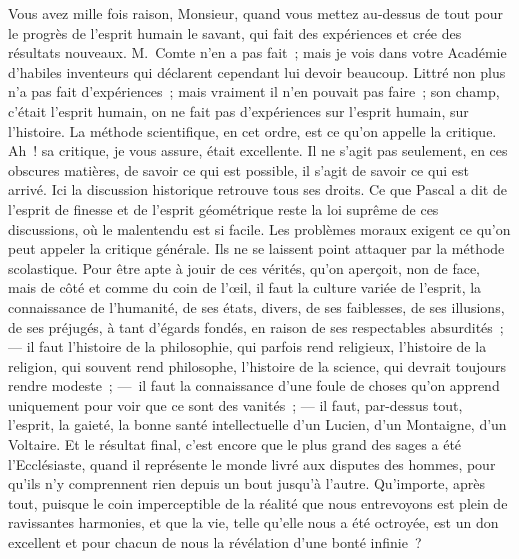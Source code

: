\documentclass[french,twoside]{book} %
\newcommand\orgName[1]{#1}
\newcommand\persName[1]{#1}
\begin{document}
Vous avez mille fois raison, Monsieur, quand vous mettez au-dessus de tout pour le progrès de l’esprit humain le savant, qui fait des expériences et crée des résultats nouveaux. {\persName M. Comte} n’en a pas fait ; mais je vois dans votre {\orgName Académie} d’habiles inventeurs qui déclarent cependant lui devoir beaucoup. {\persName Littré} non plus n’a pas fait d’expériences ; mais vraiment il n’en pouvait pas faire ; son champ, c’était l’esprit humain, on ne fait pas d’expériences sur l’esprit humain, sur l’histoire. La méthode scientifique, en cet ordre, est ce qu’on appelle la critique. Ah ! sa critique, je vous assure, était excellente. Il ne s’agit pas seulement, en ces obscures matières, de savoir ce qui est possible, il s’agit de savoir ce qui est arrivé. Ici la discussion historique retrouve tous ses droits. Ce que {\persName Pascal} a dit de l’esprit de finesse et de l’esprit géométrique reste la loi suprême de ces discussions, où le malentendu est si facile. Les problèmes moraux exigent ce qu’on peut appeler la critique générale. Ils ne se laissent point attaquer par la méthode scolastique. Pour être apte à jouir de ces vérités, qu’on aperçoit, non de face, mais de côté et comme du coin de l’œil, il faut la culture variée de l’esprit, la connaissance de l’humanité, de ses états, divers, de ses faiblesses, de ses illusions, de ses préjugés, à tant d’égards fondés, en raison de ses respectables absurdités ; — il faut l’histoire de la philosophie, qui parfois rend religieux, l’histoire de la religion, qui souvent rend philosophe, l’histoire de la science, qui devrait toujours rendre modeste ; — il faut la connaissance d’une foule de choses qu’on apprend uniquement pour voir que ce sont des vanités ; — il faut, par-dessus tout, l’esprit, la gaieté, la bonne santé intellectuelle d’un {\persName Lucien}, d’un {\persName Montaigne}, d’un {\persName Voltaire}. Et le résultat final, c’est encore que le plus grand des sages a été l’{\persName Ecclésiaste}, quand il représente le monde livré aux disputes des hommes, pour qu’ils n’y comprennent rien depuis un bout jusqu’à l’autre. Qu’importe, après tout, puisque le coin imperceptible de la réalité que nous entrevoyons est plein de ravissantes harmonies, et que la vie, telle qu’elle nous a été octroyée, est un don excellent et pour chacun de nous la révélation d’une bonté infinie ?\par
\end{document}
